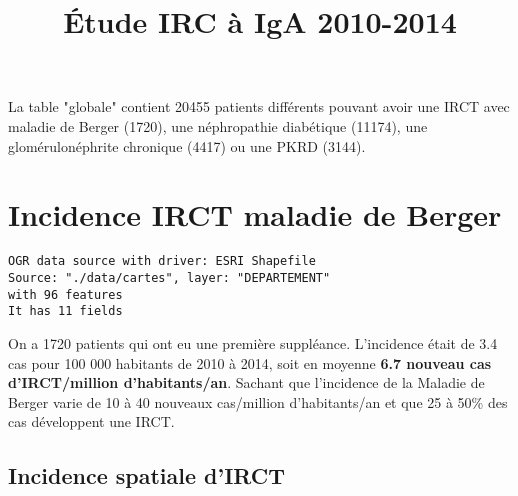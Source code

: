 \documentclass[11pt,a4paper]{article}\usepackage[]{graphicx}\usepackage[]{color}
\title{Étude IRC à IgA 2010-2014}
\makeatletter
\newenvironment{kframe}{%
 \def\at@end@of@kframe{}%
 \ifinner\ifhmode%
  \def\at@end@of@kframe{\end{minipage}}%
  \begin{minipage}{\columnwidth}%
 \fi\fi%
 \def\FrameCommand##1{\hskip\@totalleftmargin \hskip-\fboxsep
 \colorbox{shadecolor}{##1}\hskip-\fboxsep
     \hskip-\linewidth \hskip-\@totalleftmargin \hskip\columnwidth}%
 \MakeFramed {\advance\hsize-\width
   \@totalleftmargin\z@ \linewidth\hsize
   \@setminipage}}%
 {\par\unskip\endMakeFramed%
 \at@end@of@kframe}
\newenvironment{knitrout}{}{} %
\makeatother
\begin{document}
\maketitle

\tableofcontents

\newpage





La table "globale" contient 20455 patients différents pouvant avoir une IRCT avec maladie de Berger (1720), une néphropathie diabétique (11174), une glomérulonéphrite chronique (4417) ou une PKRD (3144).

\section{Incidence IRCT maladie de Berger}
\begin{knitrout}
\color{fgcolor}\begin{kframe}
\begin{verbatim}
OGR data source with driver: ESRI Shapefile 
Source: "./data/cartes", layer: "DEPARTEMENT"
with 96 features
It has 11 fields
\end{verbatim}
\end{kframe}
\end{knitrout}
On a 1720 patients qui ont eu une première suppléance. L'incidence était de 3.4 cas pour 100 000 habitants de 2010 à 2014, soit en moyenne \textbf{6.7 nouveau cas d'IRCT/million d'habitants/an}. Sachant que l’incidence de la Maladie de Berger varie de 10 à 40 nouveaux cas/million d’habitants/an et que 25 à 50\% des cas développent une IRCT.

  \subsection{Incidence spatiale d'IRCT}
\end{document}
